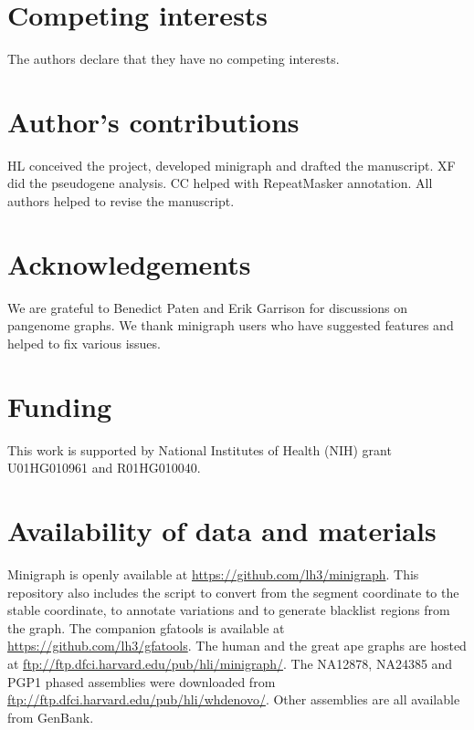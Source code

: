 \documentclass[twocolumn]{bmcart}%
\begin{document}
\begin{backmatter}

\section*{Competing interests}
The authors declare that they have no competing interests.

\section*{Author's contributions}
HL conceived the project, developed minigraph and drafted the manuscript.
XF did the pseudogene analysis. CC helped with RepeatMasker annotation.
All authors helped to revise the manuscript.

\section*{Acknowledgements}
We are grateful to Benedict Paten and Erik Garrison for discussions on
pangenome graphs. We thank minigraph users who have suggested features and
helped to fix various issues.

\section*{Funding}
This work is supported by National Institutes of Health (NIH) grant
U01HG010961 and R01HG010040.

\section*{Availability of data and materials}
Minigraph is openly available at
\href{https://github.com/lh3/minigraph}{https://github.com/lh3/minigraph}.
This repository also includes the script to convert from the segment coordinate
to the stable coordinate, to annotate variations and to generate blacklist
regions from the graph. The companion gfatools is available at
\href{https://github.com/lh3/gfatols}{https://github.com/lh3/gfatools}. The
human and the great ape graphs are hosted at
\href{ftp://ftp.dfci.harvard.edu/pub/hli/minigraph/}{ftp://ftp.dfci.harvard.edu/pub/hli/minigraph/}.
The NA12878, NA24385 and PGP1 phased assemblies were downloaded from
\href{ftp://ftp.dfci.harvard.edu/pub/hli/whdenovo/}{ftp://ftp.dfci.harvard.edu/pub/hli/whdenovo/}.
Other assemblies are all available from GenBank.






\end{backmatter}
\end{document}
